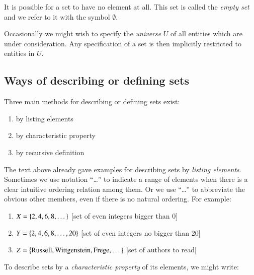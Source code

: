 \documentclass[nobib,nofonts]{tufte-handout}
\newcommand{\mygray}[1]{\textcolor{mygray2}{#1}}
\begin{document}
It is possible for a set to have no element at all. This set is called the \emph{empty set} and
we refer to it with the symbol $\emptyset$.

Occasionally we might wish to specify the \emph{universe} $U$ of all entities which are under
consideration.
Any specification of a set is then implicitly restricted to entities in $U$.

\subsection{Ways of describing or defining sets}

Three main methods for describing or defining sets exist:
\begin{enumerate}
\item by listing elements
\item by characteristic property
\item by recursive definition
\end{enumerate}

\noindent The text above already gave examples for describing sets by \emph{listing
elements}. Sometimes we use notation ``\dots'' to indicate a range of elements when there is a
clear intuitive ordering relation among them. Or we use ``\dots'' to abbreviate the obvious
other members, even if there is no natural ordering. For example:

\begin{enumerate}[]
\item $X = \left\{2, 4, 6, 8, \dots\right\}$ \hfill \mygray{[set of even integers bigger than 0]}
\item $Y = \left\{2, 4, 6, 8, \dots, 20\right\}$ \hfill \mygray{[set of even integers no bigger than
    20]}
\item $Z = \left\{\text{Russell}, \text{Wittgenstein}, \text{Frege}, \dots\right\}$ \hfill {\mygray{[set of
    authors to read]}}
\end{enumerate}

To describe sets by a \emph{characteristic property} of its elements, we might write:
\end{document}
